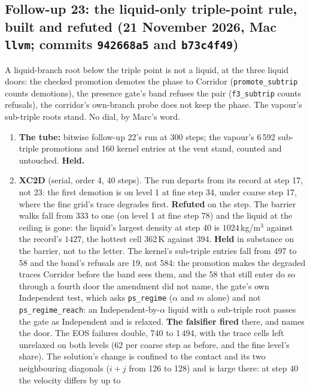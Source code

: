 \documentclass[11pt,a4paper]{article}
\newcommand{\code}[1]{\texttt{\small #1}}
\begin{document}
\subsection{Follow-up 23: the liquid-only triple-point rule, built and refuted (21 November 2026, Mac \code{llvm}; commits \code{942668a5} and \code{b73c4f49})}

A liquid-branch root below the triple point is not a liquid, at the
three liquid doors: the checked promotion demotes the phase to Corridor
(\code{promote\_subtrip} counts demotions), the presence gate's band
refuses the pair (\code{f3\_subtrip} counts refusals), the corridor's
own-branch probe does not keep the phase.  The vapour's sub-triple
roots stand.  No dial, by Marc's word.
\begin{enumerate}[nosep]
\item \textbf{The tube:} bitwise follow-up 22's run at 300 steps; the vapour's 6\,592 sub-triple promotions and 160 kernel entries at the vent stand, counted and untouched.  \textbf{Held.}
\item \textbf{XC2D} (serial, order 4, 40 steps).  The run departs from
      its record at step 17, not 23: the first demotion is on level 1
      at fine step 34, under coarse step 17, where the fine grid's trace
      degrades first.  \textbf{Refuted} on the step.  The barrier walks
      fall from 333 to one (on level 1 at fine step 78) and the liquid
      at the ceiling is gone: the liquid's largest density at step 40 is
      $1024$\,kg/m$^3$ against the record's $1427$, the hottest cell
      362\,K against 394.  \textbf{Held} in substance on the barrier, not
      to the letter.  The kernel's sub-triple entries fall from 497 to
      58 and the band's refusals are 19, not 584: the promotion makes the
      degraded traces Corridor before the band sees them, and the
      58 that still enter do so through a fourth door the amendment did
      not name, the gate's own Independent test, which asks
      \code{ps\_regime} ($\alpha$ and $m$ alone) and not
      \code{ps\_regime\_reach}: an Independent-by-$\alpha$ liquid with a
      sub-triple root passes the gate as Independent and is relaxed.
      \textbf{The falsifier fired} there, and names the door.  The EOS
      failures double, 740 to 1\,494, with the trace cells left
      unrelaxed on both levels (62 per coarse step as before, and the
      fine level's share).  The solution's change is confined to the
      contact and its two neighbouring diagonals ($i + j$ from 126 to
      128) and is large there: at step 40 the velocity differs by up to

\end{enumerate}
\end{document}
